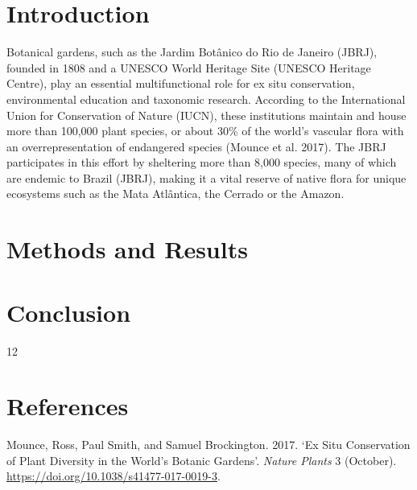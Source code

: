 \documentclass[
  british,
  11pt,
]{stylisharticle}
\affiliation{%
      \textsuperscript{1}%
      Université de Montpellier%
      , 30 place Eugène Bataillon%
      , Montpellier%
      , France%
      , 34090%
    }
\affiliation{%
      \textsuperscript{2}%
      AgroParisTech%
      , 648 Rue Jean François Breton%
      , Montpellier%
      , France%
      , 34090%
    }
\affiliation{%
      \textsuperscript{3}%
      , Rio de Janeiro%
      , Brasil%
    }
\newlength{\cslhangindent}
\newenvironment{CSLReferences}[2] %
 {\begin{list}{}{%
  \setlength{\itemindent}{0pt}
  \setlength{\leftmargin}{0pt}
  \setlength{\parsep}{0pt}
  \ifodd #1
   \setlength{\leftmargin}{\cslhangindent}
   \setlength{\itemindent}{-1\cslhangindent}
  \fi
  \setlength{\itemsep}{#2\baselineskip}}}
 {\end{list}}
\begin{document}
\flushbottom

\maketitle

\tableofcontents

\thispagestyle{empty}

\section{Introduction}\label{introduction}

Botanical gardens, such as the Jardim Botânico do Rio de Janeiro (JBRJ),
founded in 1808 and a UNESCO World Heritage Site (UNESCO Heritage
Centre), play an essential multifunctional role for ex situ
conservation, environmental education and taxonomic research. According
to the International Union for Conservation of Nature (IUCN), these
institutions maintain and house more than 100,000 plant species, or
about 30\% of the world's vascular flora with an overrepresentation of
endangered species (Mounce et al. 2017). The JBRJ participates in this
effort by sheltering more than 8,000 species, many of which are endemic
to Brazil (JBRJ), making it a vital reserve of native flora for unique
ecosystems such as the Mata Atlântica, the Cerrado or the Amazon.

\section{Methods and Results}\label{methods-and-results}

\section{Conclusion}\label{conclusion}

12

\section*{References}\label{bibliography}

\protect{}\label{refs}
\begin{CSLReferences}{1}{1}
Mounce, Ross, Paul Smith, and Samuel Brockington. 2017. {`Ex Situ
Conservation of Plant Diversity in the World{'}s Botanic Gardens'}.
\emph{Nature Plants} 3 (October).
\url{https://doi.org/10.1038/s41477-017-0019-3}.

\end{CSLReferences}
\end{document}
